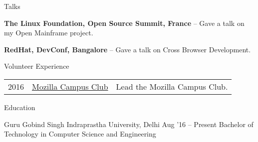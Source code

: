 \documentclass{resume} %
\begin{document}

\begin{rSection}{Talks}
  \begin{rProjectSection}
    \item \textbf {The Linux Foundation, Open Source Summit, France} -- Gave a talk on my Open Mainframe project.
  \end{rProjectSection}
  \begin{rProjectSection}
    \item \textbf {RedHat, DevConf, Bangalore} -- Gave a talk on Cross Browser Development.
  \end{rProjectSection}
\end{rSection}


\begin{rSection}{Volunteer Experience}
  \begin{tabular}{rll}
2016	     & {\href{https://github.com/moz-niec/}{Mozilla Campus Club}}  & Lead the Mozilla Campus Club.\\
\end{tabular}
\end{rSection}


\begin{rSection}{Education}
  \begin{rEducationSection}{Guru Gobind Singh Indraprastha University, Delhi}
                           {Aug '16 -- Present}
                           {Bachelor of Technology in Computer Science and Engineering}
  \end{rEducationSection}
\end{rSection}
\end{document}
